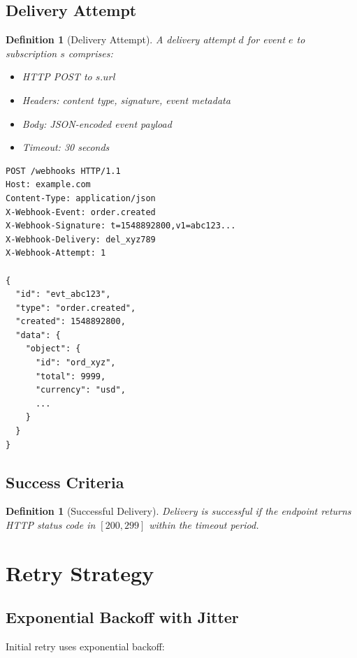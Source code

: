\documentclass[11pt,a4paper]{article}
\newtheorem{definition}[theorem]{Definition}
\begin{document}
\subsection{Delivery Attempt}

\begin{definition}[Delivery Attempt]
A delivery attempt $d$ for event $e$ to subscription $s$ comprises:
\begin{itemize}
    \item HTTP POST to $s.url$
    \item Headers: content type, signature, event metadata
    \item Body: JSON-encoded event payload
    \item Timeout: 30 seconds
\end{itemize}
\end{definition}

\begin{lstlisting}[caption=Webhook Request Format]
POST /webhooks HTTP/1.1
Host: example.com
Content-Type: application/json
X-Webhook-Event: order.created
X-Webhook-Signature: t=1548892800,v1=abc123...
X-Webhook-Delivery: del_xyz789
X-Webhook-Attempt: 1

{
  "id": "evt_abc123",
  "type": "order.created",
  "created": 1548892800,
  "data": {
    "object": {
      "id": "ord_xyz",
      "total": 9999,
      "currency": "usd",
      ...
    }
  }
}
\end{lstlisting}

\subsection{Success Criteria}

\begin{definition}[Successful Delivery]
Delivery is successful if the endpoint returns HTTP status code in $[200, 299]$ within the timeout period.
\end{definition}

\section{Retry Strategy}

\subsection{Exponential Backoff with Jitter}

Initial retry uses exponential backoff:
\end{document}
